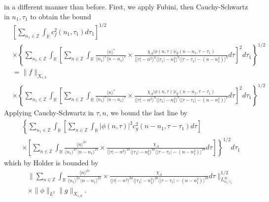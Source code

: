 \documentclass[12pt,reqno]{amsart}
\numberwithin{equation}{section}  %
\numberwithin{figure}{section}
\newcommand{\rr}{\mathbb{R}}
\newcommand{\zz}{\mathbb{Z}}
\theoremstyle{plain}
\theoremstyle{definition}
\theoremstyle{remark}
\begin{document}
in a different manner than before. First, we apply 
Fubini, then Cauchy-Schwartz in $n_{1}, \tau_{1}$ to obtain the bound
%
%
\begin{equation*}
\begin{split}
  & \left[ \sum_{n_{1} \in \zz} \int_{\rr} c_{f}^{2}(n_{1}, \tau_{1}) d \tau_{1}
  \right]^{1/2}
  \\
  & \times \left \{ \sum_{n_{1} \in \zz} \int_{\rr}   
 \left[
 \sum_{n \in \zz} \int_{\rr}
   \frac{\langle n \rangle ^{s}}{\langle n_{1} \rangle ^{s} \langle
   n - n_{1}\rangle ^{s}} \times \frac{\chi_{A} |\phi(n, \tau)| c_{g}(n -
   n_{1}, \tau - \tau_{1})
}{\langle | \tau | - n^{2} \rangle
  ^{a} \langle | \tau_{1} | - n_{1}^{2} \rangle ^{b} \langle | \tau -
  \tau_{1} | - (n - n_{1}^{2}) \rangle ^{b}} d \tau 
  \right]^{2} d \tau_{1} \right \}^{1/2}
  \\
  & = \| f \|_{X_{s,b}}
  \\
  & \times \left \{ \sum_{n_{1} \in \zz} \int_{\rr}   
 \left[
 \sum_{n \in \zz} \int_{\rr}
   \frac{\langle n \rangle ^{s}}{\langle n_{1} \rangle ^{s} \langle
   n - n_{1}\rangle ^{s}} \times \frac{\chi_{A}|\phi(n, \tau)| c_{g}(n -
   n_{1}, \tau - \tau_{1})
}{\langle | \tau | - n^{2} \rangle
  ^{a} \langle | \tau_{1} | - n_{1}^{2} \rangle ^{b} \langle | \tau -
  \tau_{1} | - (n - n_{1}^{2}) \rangle ^{b}} d \tau 
  \right]^{2} d \tau_{1}  \right \}^{1/2}
\end{split}
\end{equation*}
%
Applying Cauchy-Schwartz in $\tau, n$, we bound the last line by 
%
%
\begin{equation*}
\begin{split}
  & \left \{ \sum_{n_{1} \in \zz} \int_{\rr}   
  \left [ \sum_{n \in \zz} \int_{\rr}
  | \phi(n, \tau)|^{2} c_{g}^{2}(n - n_{1}, \tau - \tau_{1}) d \tau  
    \right ] \right . 
   \\
   & \left. \times \left [ \sum_{n \in \zz} \int_{\rr} \frac{\langle n \rangle
   ^{2s}}{\langle n_{1} \rangle ^{2s} \langle n - n_{1}\rangle ^{2s}}
   \times \frac{\chi_{A}}{\langle | \tau | - n^{2} \rangle ^{2a} \langle | \tau_{1} |
   - n_{1}^{2} \rangle ^{2b} \langle | \tau - \tau_{1} | - (n - n_{1}^{2})
   \rangle ^{2b}} d \tau  \right ] \right \}^{1/2}d \tau_{1} 
\end{split}
\end{equation*}
%
%
which by Holder is bounded by 
%
%
%
\begin{equation}
  \label{integral-bound-2nd-form-per}
\begin{split}
  & \| \sum_{n \in \zz} \int_{\rr} \frac{\langle n \rangle ^{2s}}{\langle n_{1} \rangle ^{2s} \langle
  n - n_{1}\rangle ^{2s}}  \times \frac{\chi_{A}}{\langle | \tau | - n^{2} \rangle
  ^{2a} \langle | \tau_{1} | - n_{1}^{2} \rangle ^{2b} \langle | \tau -
  \tau_{1} | - (n - n_{1}^{2}) \rangle ^{2b}} d \tau 
  \|_{L^{\infty}_{n_{1}, \tau_{1}}}^{1/2}
  \\
  & \times \|\phi\|_{L^{2}} \| g \|_{X_{s,b}}.
\end{split}
\end{equation}
\end{document}
